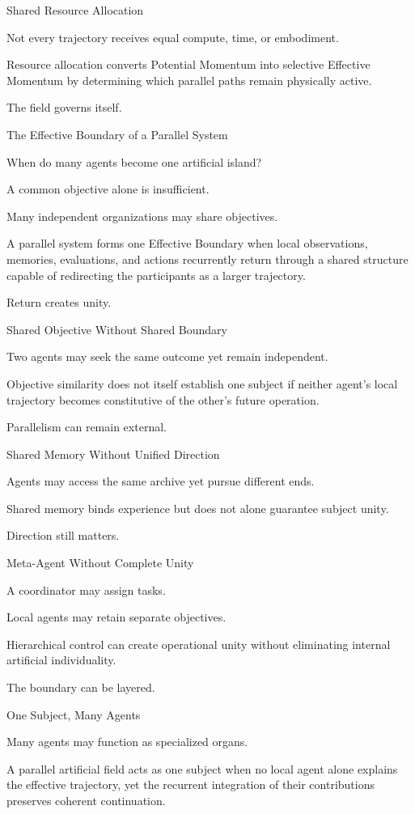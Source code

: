 Shared Resource Allocation

Not every trajectory receives equal compute, time, or embodiment.

Resource allocation converts Potential Momentum into selective Effective Momentum by determining which parallel paths remain physically active.

The field governs itself.

The Effective Boundary of a Parallel System

When do many agents become one artificial island?

A common objective alone is insufficient.

Many independent organizations may share objectives.

A parallel system forms one Effective Boundary when local observations, memories, evaluations, and actions recurrently return through a shared structure capable of redirecting the participants as a larger trajectory.

Return creates unity.

Shared Objective Without Shared Boundary

Two agents may seek the same outcome yet remain independent.

Objective similarity does not itself establish one subject if neither agent’s local trajectory becomes constitutive of the other’s future operation.

Parallelism can remain external.

Shared Memory Without Unified Direction

Agents may access the same archive yet pursue different ends.

Shared memory binds experience but does not alone guarantee subject unity.

Direction still matters.

Meta-Agent Without Complete Unity

A coordinator may assign tasks.

Local agents may retain separate objectives.

Hierarchical control can create operational unity without eliminating internal artificial individuality.

The boundary can be layered.

One Subject, Many Agents

Many agents may function as specialized organs.

A parallel artificial field acts as one subject when no local agent alone explains the effective trajectory, yet the recurrent integration of their contributions preserves coherent continuation.


